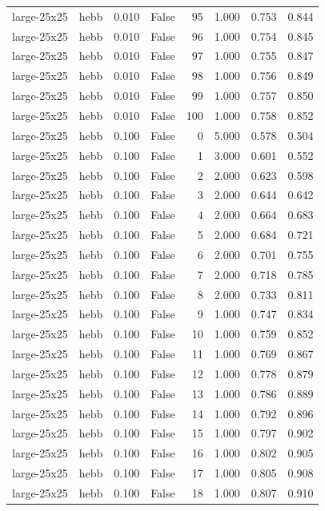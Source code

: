 \begin{tabular}{llrrrrrr}
large-25x25 & hebb & 0.010 & False & 95 & 1.000 & 0.753 & 0.844 \\
large-25x25 & hebb & 0.010 & False & 96 & 1.000 & 0.754 & 0.845 \\
large-25x25 & hebb & 0.010 & False & 97 & 1.000 & 0.755 & 0.847 \\
large-25x25 & hebb & 0.010 & False & 98 & 1.000 & 0.756 & 0.849 \\
large-25x25 & hebb & 0.010 & False & 99 & 1.000 & 0.757 & 0.850 \\
large-25x25 & hebb & 0.010 & False & 100 & 1.000 & 0.758 & 0.852 \\
large-25x25 & hebb & 0.100 & False & 0 & 5.000 & 0.578 & 0.504 \\
large-25x25 & hebb & 0.100 & False & 1 & 3.000 & 0.601 & 0.552 \\
large-25x25 & hebb & 0.100 & False & 2 & 2.000 & 0.623 & 0.598 \\
large-25x25 & hebb & 0.100 & False & 3 & 2.000 & 0.644 & 0.642 \\
large-25x25 & hebb & 0.100 & False & 4 & 2.000 & 0.664 & 0.683 \\
large-25x25 & hebb & 0.100 & False & 5 & 2.000 & 0.684 & 0.721 \\
large-25x25 & hebb & 0.100 & False & 6 & 2.000 & 0.701 & 0.755 \\
large-25x25 & hebb & 0.100 & False & 7 & 2.000 & 0.718 & 0.785 \\
large-25x25 & hebb & 0.100 & False & 8 & 2.000 & 0.733 & 0.811 \\
large-25x25 & hebb & 0.100 & False & 9 & 1.000 & 0.747 & 0.834 \\
large-25x25 & hebb & 0.100 & False & 10 & 1.000 & 0.759 & 0.852 \\
large-25x25 & hebb & 0.100 & False & 11 & 1.000 & 0.769 & 0.867 \\
large-25x25 & hebb & 0.100 & False & 12 & 1.000 & 0.778 & 0.879 \\
large-25x25 & hebb & 0.100 & False & 13 & 1.000 & 0.786 & 0.889 \\
large-25x25 & hebb & 0.100 & False & 14 & 1.000 & 0.792 & 0.896 \\
large-25x25 & hebb & 0.100 & False & 15 & 1.000 & 0.797 & 0.902 \\
large-25x25 & hebb & 0.100 & False & 16 & 1.000 & 0.802 & 0.905 \\
large-25x25 & hebb & 0.100 & False & 17 & 1.000 & 0.805 & 0.908 \\
large-25x25 & hebb & 0.100 & False & 18 & 1.000 & 0.807 & 0.910 \\

\end{tabular}
